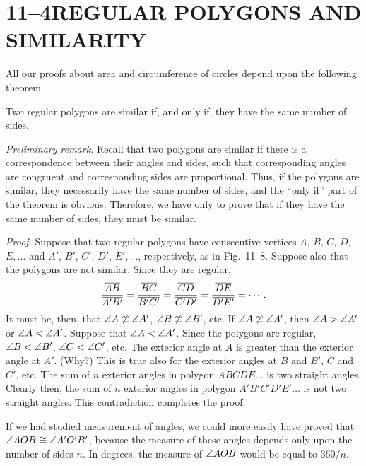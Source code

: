 \documentclass[11pt]{book}
\theoremstyle{XIplainnote}
\theoremstyle{bkplain}
\begin{document}
\section*{11--4\quad REGULAR POLYGONS AND SIMILARITY}

All our proofs about area and circumference of circles depend upon the
following theorem.

\begin{theorem}
Two regular polygons are similar if, and only if, they have the same number of
sides.
\end{theorem}

\noindent\emph{Preliminary remark.} Recall that two polygons are similar if
there is a correspondence between their angles and sides, such that
corresponding angles are congruent and corresponding sides are proportional.
Thus, if the polygons are similar, they necessarily have the same number of
sides, and the ``only if'' part of the theorem is obvious. Therefore, we have
only to prove that if they have the same number of sides, they must be similar.

\noindent\emph{Proof.} Suppose that two regular polygons have consecutive
vertices $A$, $B$, $C$, $D$, $E,\ldots$ and $A'$, $B'$, $C'$, $D'$,
$E',\ldots$, respectively, as in Fig.~11--8. Suppose also that the polygons are
not similar. Since they are regular,
\[
\frac{\overline{AB}}{\overline{A'B'}} = \frac{\overline{BC}}{\overline{B'C'}}
= \frac{\overline{CD}}{\overline{C'D'}} = \frac{\overline{DE}}{\overline{D'E'}} = \cdots.
\]
It must be, then, that $\angle A \ncong \angle A'$, $\angle B \ncong \angle B'$,
etc. If $\angle A \ncong \angle A'$, then $\angle A > \angle A'$ or
$\angle A < \angle A'$. Suppose that $\angle A < \angle A'$. Since the polygons are
regular, $\angle B < \angle B'$, $\angle C < \angle C'$, etc. The exterior angle at
$A$ is greater than the exterior angle at $A'$. (Why?) This is true also for
the exterior angles at $B$ and $B'$, $C$ and $C'$, etc. The sum of $n$ exterior
angles in polygon $ABCDE\ldots$ is two straight angles. Clearly then, the sum
of $n$ exterior angles in polygon $A'B'C'D'E'\ldots$ is not two straight
angles. This contradiction completes the proof.

\begin{remark}
If we had studied measurement of angles, we could more easily have proved that
$\angle AOB \cong \angle A'O'B'$, because the measure of these angles depends
only upon the number of sides $n$. In degrees, the measure of $\angle AOB$ would
be equal to $360/n$.
\end{remark}
\end{document}
